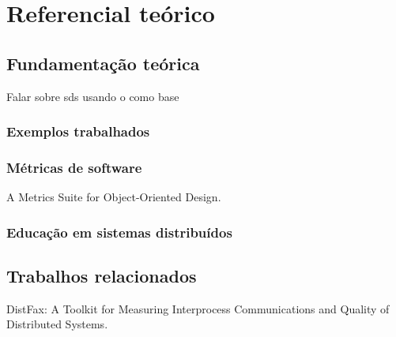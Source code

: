\chapter{Referencial teórico}
\label{cap:referencialTeorico}


\section{Fundamentação teórica}
\label{section:background}
Falar sobre \gls{sds} usando o \cite{DistributedSystemsCoulouris} como base


\subsection{Exemplos trabalhados}


\subsection{Métricas de software}

A Metrics Suite for Object-Oriented Design.
\cite{MetricsSuite}

\subsection{Educação em sistemas distribuídos}


\section{Trabalhos relacionados}
\label{section:related-work}

DistFax: A Toolkit for Measuring Interprocess Communications and Quality of Distributed Systems.
\cite{DistFax}
